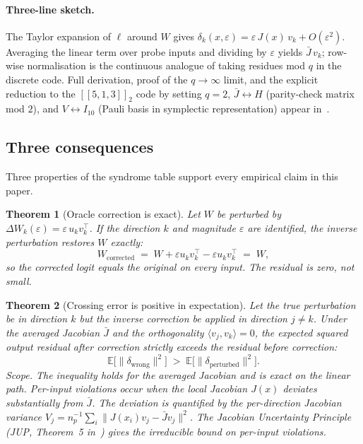\documentclass[11pt,a4paper]{article}
\newtheorem{theorem}{Theorem}[section]
\newcommand{\Ccode}[3]{[\![#1,#2,#3]\!]}
\newcommand{\Jbar}{\bar{J}}
\begin{document}
\paragraph{Three-line sketch.} The Taylor expansion of $\ell$ around $W$ gives $\delta_k(x, \varepsilon) = \varepsilon\, J(x)\, v_k + O(\varepsilon^2)$. Averaging the linear term over probe inputs and dividing by $\varepsilon$ yields $\Jbar\, v_k$; row-wise normalisation is the continuous analogue of taking residues mod $q$ in the discrete code. Full derivation, proof of the $q \to \infty$ limit, and the explicit reduction to the $\Ccode{5}{1}{3}_2$ code by setting $q = 2$, $\Jbar \leftrightarrow H$ (parity-check matrix mod $2$), and $V \leftrightarrow I_{10}$ (Pauli basis in symplectic representation) appear in~\cite{SyndromeAlgebra}.


\subsection{Three consequences}
\label{sec:algebra-thms}

Three properties of the syndrome table support every empirical claim in this paper. 

\begin{theorem}[Oracle correction is exact]
\label{thm:oracle}
Let $W$ be perturbed by $\Delta W_k(\varepsilon) = \varepsilon\, u_k v_k^\top$. If the direction $k$ and magnitude $\varepsilon$ are identified, the inverse perturbation restores $W$ exactly:
\[
   W_{\mathrm{corrected}}
   \;=\; W + \varepsilon u_k v_k^\top - \varepsilon u_k v_k^\top
   \;=\; W,
\]
so the corrected logit equals the original on every input. The residual is zero, not small.
\end{theorem}

\begin{theorem}[Crossing error is positive in expectation]
\label{thm:cross}
Let the true perturbation be in direction $k$ but the inverse correction be applied in direction $j \neq k$. Under the averaged Jacobian $\Jbar$ and the orthogonality $\langle v_j, v_k \rangle = 0$, the expected squared output residual after correction strictly exceeds the residual before correction:
\[
   \mathbb{E}\bigl[\|\delta_{\mathrm{wrong}}\|^2\bigr]
   \;>\;
   \mathbb{E}\bigl[\|\delta_{\mathrm{perturbed}}\|^2\bigr].
\]
\emph{Scope.} The inequality holds for the averaged Jacobian and is exact on the linear path. Per-input violations occur when the local Jacobian $J(x)$ deviates substantially from $\Jbar$. The deviation is quantified by the per-direction Jacobian variance $V_j = n_p^{-1} \sum_i \|J(x_i) v_j -
\Jbar v_j\|^2$. The Jacobian Uncertainty Principle (JUP, Theorem~5 in~\cite{SyndromeAlgebra}) gives the irreducible bound on per-input violations.
\end{theorem}
\end{document}
